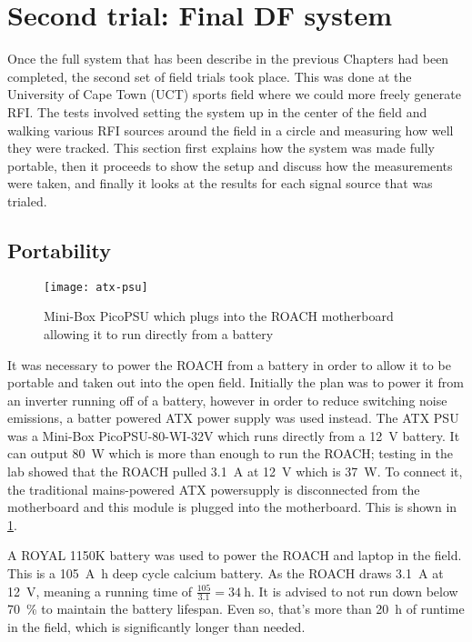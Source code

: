 \section{Second trial: Final DF system}
Once the full system that has been describe in the previous Chapters had been completed, the second set of field trials took place. This was done at the University of Cape Town (UCT) sports field where we could more freely generate RFI. The tests involved setting the system up in the center of the field and walking various RFI sources around the field in a circle and measuring how well they were tracked. This section first explains how the system was made fully portable, then it proceeds to show the setup and discuss how the measurements were taken, and finally it looks at the results for each signal source that was trialed.

\subsection{Portability}
\begin{figure}
  \centering
  \texttt{[image: atx-psu]}
  \caption{Mini-Box PicoPSU which plugs into the ROACH motherboard allowing it to run directly from a battery}
  \label{fig:field-trials:atx-psu}
\end{figure}
It was necessary to power the ROACH from a battery in order to allow it to be portable and taken out into the open field.
Initially the plan was to power it from an inverter running off of a battery, however in order to reduce switching noise emissions, a batter powered ATX power supply was used instead. The ATX PSU was a Mini-Box PicoPSU-80-WI-32V which runs directly from a \SI{12}{\volt} battery. 
It can output \SI{80}{\watt} which is more than enough to run the ROACH; testing in the lab showed that the ROACH pulled \SI{3.1}{\ampere} at \SI{12}{\volt} which is \SI{37}{\watt}.
To connect it, the traditional mains-powered ATX powersupply is disconnected from the motherboard and this module is plugged into the motherboard. 
This is shown in \cref{fig:field-trials:atx-psu}.

A ROYAL 1150K battery was used to power the ROACH and laptop in the field. 
This is a \SI{105}{\ampere\hour} deep cycle calcium battery.
As the ROACH draws \SI{3.1}{\ampere} at \SI{12}{\volt}, meaning a running time of \(\frac{105}{3.1} = \SI{34}{\hour}\).
It is advised to not run down below \SI{70}{\percent} to maintain the battery lifespan. Even so, that's more than \SI{20}{\hour} of runtime in the field, which is significantly longer than needed.


